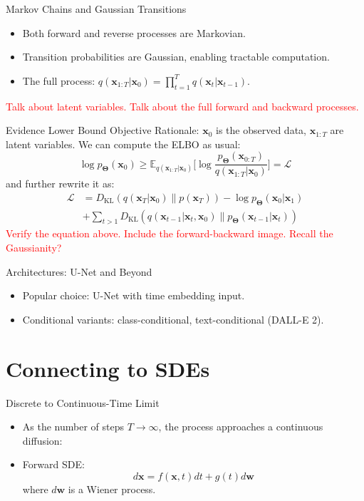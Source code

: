 \documentclass{beamer}
\newcommand{\bs}[1]{\boldsymbol{#1}}
\begin{document}
\begin{frame}{Markov Chains and Gaussian Transitions}
    \begin{itemize}
        \item Both forward and reverse processes are Markovian.
        \item Transition probabilities are Gaussian, enabling tractable computation.
        \item The full process: \(q(\bs{x}_{1:T} | \bs{x}_0) = \prod_{t=1}^T q(\bs{x}_t | \bs{x}_{t-1})\).
    \end{itemize}
    \textcolor{red}{Talk about latent variables. Talk about the full forward and backward processes.}
\end{frame}

\begin{frame}{Evidence Lower Bound Objective}
Rationale: $\bs{x}_0$ is the observed data, $\bs{x}_{1:T}$ are latent variables. We can compute the ELBO as usual:
\begin{equation}
  \log p_{\bs{\Theta}}(\bs{x}_0) \geq \mathbb{E}_{q(\bs{x}_{1:T}|\bs{x}_0)} \Bigg[\log \frac{p_{\bs{\Theta}}(\bs{x}_{0:T})}{q(\bs{x}_{1:T}|\bs{x}_0)}\Bigg] = \mathcal{L}
\end{equation}
and further rewrite it as:
\begin{align}
  \mathcal{L} &= D_{\text{KL}}(q(\bs{x}_T | \bs{x}_0) \| p(\bs{x}_T)) - \log p_{\bs{\Theta}}(\bs{x}_0 | \bs{x}_1) \\
  &+ \sum_{t>1} D_{\text{KL}}(q(\bs{x}_{t-1} | \bs{x}_t, \bs{x}_0) \| p_{\bs{\Theta}}(\bs{x}_{t-1} | \bs{x}_t)) 
\end{align}  
    \textcolor{red}{Verify the equation above. Include the forward-backward image. Recall the Gaussianity?}

\end{frame}

\begin{frame}{Architectures: U-Net and Beyond}
    \begin{itemize}
        \item Popular choice: U-Net with time embedding input.
        \item Conditional variants: class-conditional, text-conditional (DALL-E 2).
    \end{itemize}
\end{frame}

\section{Connecting to SDEs}
\begin{frame}{Discrete to Continuous-Time Limit}
    \begin{itemize}
        \item As the number of steps \(T \to \infty\), the process approaches a continuous diffusion:
        \item Forward SDE:
            \[
                d\bs{x} = f(\bs{x}, t)dt + g(t) d\bs{w}
            \]
            where \(d\bs{w}\) is a Wiener process.
    \end{itemize}
\end{frame}
\end{document}

